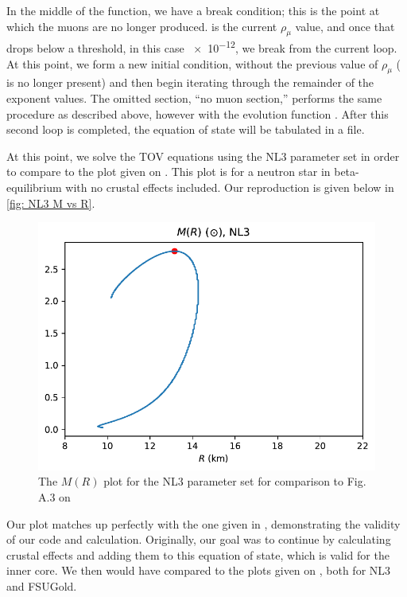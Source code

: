 In the middle of the function, we have a break condition; this is the point at which the muons are no longer produced.  is the current $\rho_\mu$ value, and once that drops below a threshold, in this case \SI{e-12}{}, we break from the current  loop. At this point, we form a new initial condition, without the previous value of $\rho_\mu$ ( is no longer present) and then begin iterating through the remainder of the exponent values. The omitted section, ``no muon section,'' performs the same procedure as described above, however with the evolution function . After this second loop is completed, the equation of state will be tabulated in a file.

At this point, we solve the TOV equations using the NL3 parameter set in order to compare to the plot given on \autocite[p. 117]{diener_2008}. This plot is for a neutron star in beta-equilibrium with no crustal effects included. Our reproduction is given below in \autoref{fig: NL3 M vs R}.

\begin{figure}[h!]
    \centering
    \includegraphics[width = .75\textwidth]{images/adv/r_analysis,NL3-2.pdf}
    \caption{The $M(R)$ plot for the NL3 parameter set for comparison to Fig. A.3 on \autocite[p. 117]{diener_2008}}
    \label{fig: NL3 M vs R}
\end{figure}

Our plot matches up perfectly with the one given in \autocite{diener_2008}, demonstrating the validity of our code and calculation. Originally, our goal was to continue by calculating crustal effects and adding them to this equation of state, which is valid for the inner core. We then would have compared to the plots given on \autocite[p. 102]{diener_2008}, both for NL3 and FSUGold.

